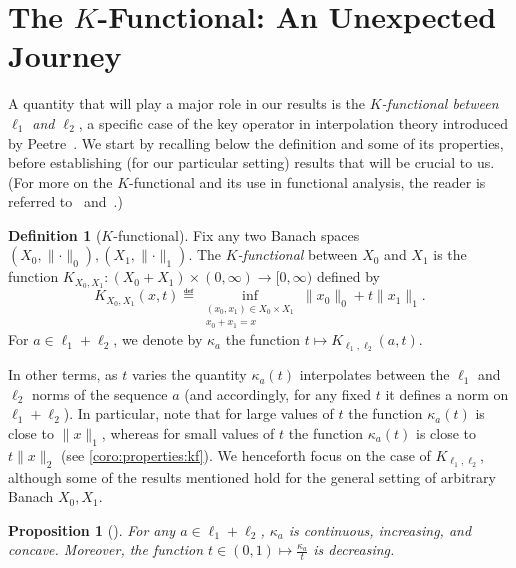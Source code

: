 \documentclass[11pt]{article}
\newtheorem{proposition}[prop]{Proposition}
\theoremstyle{remark}   	\newtheorem{remark}[theorem]{Remark}
\theoremstyle{definition}   	\newaliascnt{defn}{theorem}
\newtheorem{definition}[defn]{Definition}
\newcommand{\norm}[1]{\lVert#1{\rVert}}
\newcommand{\lp}[1][1]{\ell_{#1}}
\newcommand{\kf}[1]{\kappa_{#1}}
\begin{document}
\section{The $K$-Functional: An Unexpected Journey}\label{sec:kfunctional}
A quantity that will play a major role in our results is the \emph{$K$-functional between $\lp[1]$ and $\lp[2]$}, a specific case of the key operator in interpolation theory introduced by Peetre~\cite{Peetre:68}. We start by recalling below the definition and some of its properties, before establishing (for our particular setting) results that will be crucial to us. (For more on the $K$-functional and its use in functional analysis, the reader is referred to~\cite{BennettS:88} and~\cite{Astashkin:2010}.)
\begin{definition}[$K$-functional]\label{def:kfunctional}
Fix any two Banach spaces $(X_0, \norm{\cdot}_0), (X_1, \norm{\cdot}_1)$.
The \emph{$K$-functional} between $X_0$ and $X_1$ is the function $K_{X_0,X_1}\colon (X_0+X_1)\times(0,\infty)\to [0,\infty)$ defined by
\[
    K_{X_0,X_1}(x,t) \eqdef \inf_{\substack{(x_0,x_1)\in X_0\times X_1 \\ x_0+x_1=x}} \norm{x_0}_0 + t\norm{x_1}_1.
\]
For $a\in\lp[1]+\lp[2]$, we denote by $\kf{a}$ the function $t\mapsto K_{\lp[1],\lp[2]}(a,t)$.
\end{definition}

In other terms, as $t$ varies the quantity $\kf{a}(t)$ interpolates between the $\lp[1]$ and $\lp[2]$ norms of the sequence $a$ (and accordingly, for any fixed $t$ it defines a norm on $\lp[1]+\lp[2]$). In particular, note that for large values of $t$ the function $\kf{a}(t)$ is close to $\norm{x}_1$, whereas for small values of $t$ the function $\kf{a}(t)$ is close to $t\norm{x}_2$ (see \autoref{coro:properties:kf}). We henceforth focus on the case of $K_{\lp[1],\lp[2]}$, although some of the results mentioned hold for the general setting of arbitrary Banach $X_0,X_1$.

\begin{proposition}[{\cite[Proposition 1.2]{BennettS:88}}]\label{prop:kfunctional:basic}
For any $a\in\lp[1]+\lp[2]$, $\kf{a}$ is continuous, increasing, and concave. Moreover, the function $t\in(0,1)\mapsto \frac{\kf{a}}{t}$ is decreasing.
\end{proposition}
\end{document}
